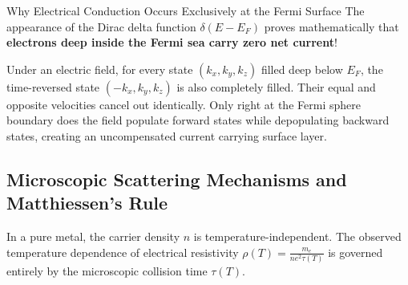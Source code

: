 \documentclass[11pt,a4paper]{article}
\begin{document}
\begin{checkpointbox}{Why Electrical Conduction Occurs Exclusively at the Fermi Surface}
The appearance of the Dirac delta function $\delta(E - E_F)$ proves mathematically that \textbf{electrons deep inside the Fermi sea carry zero net current}! 

Under an electric field, for every state $(k_x, k_y, k_z)$ filled deep below $E_F$, the time-reversed state $(-k_x, k_y, k_z)$ is also completely filled. Their equal and opposite velocities cancel out identically. Only right at the Fermi sphere boundary does the field populate forward states while depopulating backward states, creating an uncompensated current carrying surface layer.
\end{checkpointbox}

\subsection{Microscopic Scattering Mechanisms and Matthiessen's Rule}
In a pure metal, the carrier density $n$ is temperature-independent. The observed temperature dependence of electrical resistivity $\rho(T) = \frac{m_e}{n e^2 \tau(T)}$ is governed entirely by the microscopic collision time $\tau(T)$.
\end{document}
